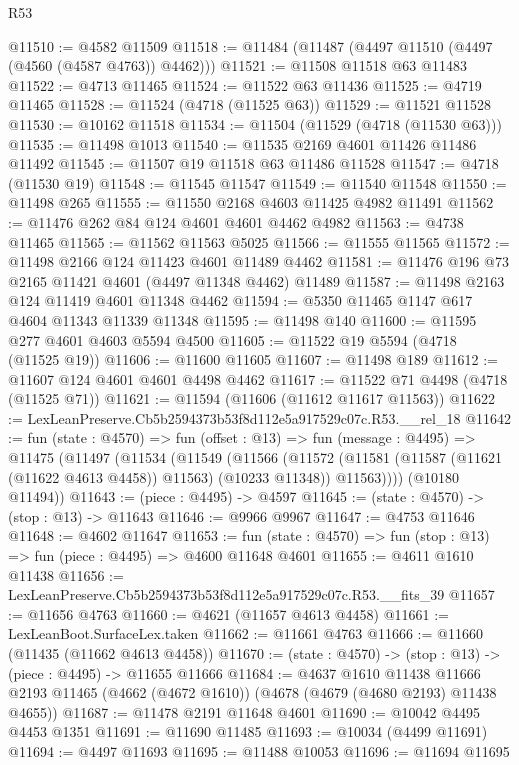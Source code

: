 \begin{lexlean}{R53}
\begin{coremodule}
@11510 := @4582 @11509
@11518 := @11484 (@11487 (@4497 @11510 (@4497 (@4560 (@4587 @4763)) @4462)))
@11521 := @11508 @11518 @63 @11483
@11522 := @4713 @11465
@11524 := @11522 @63 @11436
@11525 := @4719 @11465
@11528 := @11524 (@4718 (@11525 @63))
@11529 := @11521 @11528
@11530 := @10162 @11518
@11534 := @11504 (@11529 (@4718 (@11530 @63)))
@11535 := @11498 @1013
@11540 := @11535 @2169 @4601 @11426 @11486 @11492
@11545 := @11507 @19 @11518 @63 @11486 @11528
@11547 := @4718 (@11530 @19)
@11548 := @11545 @11547
@11549 := @11540 @11548
@11550 := @11498 @265
@11555 := @11550 @2168 @4603 @11425 @4982 @11491
@11562 := @11476 @262 @84 @124 @4601 @4601 @4462 @4982
@11563 := @4738 @11465
@11565 := @11562 @11563 @5025
@11566 := @11555 @11565
@11572 := @11498 @2166 @124 @11423 @4601 @11489 @4462
@11581 := @11476 @196 @73 @2165 @11421 @4601 (@4497 @11348 @4462) @11489
@11587 := @11498 @2163 @124 @11419 @4601 @11348 @4462
@11594 := @5350 @11465 @1147 @617 @4604 @11343 @11339 @11348
@11595 := @11498 @140
@11600 := @11595 @277 @4601 @4603 @5594 @4500
@11605 := @11522 @19 @5594 (@4718 (@11525 @19))
@11606 := @11600 @11605
@11607 := @11498 @189
@11612 := @11607 @124 @4601 @4601 @4498 @4462
@11617 := @11522 @71 @4498 (@4718 (@11525 @71))
@11621 := @11594 (@11606 (@11612 @11617 @11563))
@11622 := LexLeanPreserve.Cb5b2594373b53f8d112e5a917529c07c.R53.__rel_18
@11642 := fun (state : @4570) =>
  fun (offset : @13) =>
  fun (message : @4495) =>
  @11475
    (@11497
      (@11534
        (@11549
          (@11566
            (@11572
              (@11581 (@11587 (@11621 (@11622 @4613 @4458)) @11563) (@10233 @11348))
              @11563))))
      (@10180 @11494))
@11643 := (piece : @4495) -> @4597
@11645 := (state : @4570) -> (stop : @13) -> @11643
@11646 := @9966 @9967
@11647 := @4753 @11646
@11648 := @4602 @11647
@11653 := fun (state : @4570) => fun (stop : @13) => fun (piece : @4495) => @4600 @11648 @4601
@11655 := @4611 @1610 @11438
@11656 := LexLeanPreserve.Cb5b2594373b53f8d112e5a917529c07c.R53.__fits_39
@11657 := @11656 @4763
@11660 := @4621 (@11657 @4613 @4458)
@11661 := LexLeanBoot.SurfaceLex.taken
@11662 := @11661 @4763
@11666 := @11660 (@11435 (@11662 @4613 @4458))
@11670 := (state : @4570) -> (stop : @13) -> (piece : @4495) -> @11655 @11666
@11684 := @4637
    @1610
    @11438
    @11666
    @2193
    @11465
    (@4662 (@4672 @1610))
    (@4678 (@4679 (@4680 @2193) @11438 @4655))
@11687 := @11478 @2191 @11648 @4601
@11690 := @10042 @4495 @4453 @1351
@11691 := @11690 @11485
@11693 := @10034 (@4499 @11691)
@11694 := @4497 @11693
@11695 := @11488 @10053
@11696 := @11694 @11695

\end{coremodule}
\end{lexlean}
